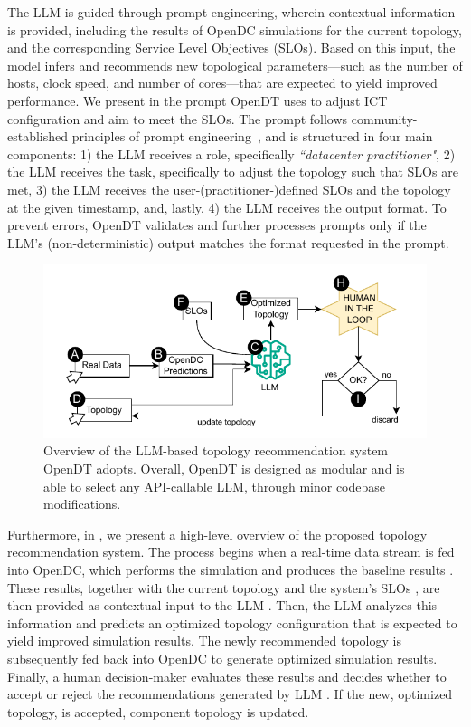 The LLM is guided through prompt engineering, wherein contextual information is provided, including the results of OpenDC simulations for the current topology, and the corresponding Service Level Objectives (SLOs). 
Based on this input, the model infers and recommends new topological parameters—such as the number of hosts, clock speed, and number of cores—that are expected to yield improved performance.
We present in  the prompt OpenDT uses to adjust ICT configuration and aim to meet the SLOs. The prompt follows community-established principles of prompt engineering~, and is structured in four main components: 1) the LLM receives a role, specifically \textit{``datacenter practitioner"}, 2) the LLM receives the task, specifically to adjust the topology such that SLOs are met, 3) the LLM receives the user-(practitioner-)defined SLOs and the topology at the given timestamp, and, lastly, 4) the LLM receives the output format. To prevent errors, OpenDT validates and further processes prompts only if the LLM's (non-deterministic) output matches the format requested in the prompt.


\begin{figure}[t]
    \centering
    \includegraphics[width=\linewidth]{report/figures/llm-hl-overview.pdf}
    \caption{Overview of the LLM-based topology recommendation system OpenDT adopts. Overall, OpenDT is designed as modular and is able to select any API-callable LLM, through minor codebase modifications.}
    \label{fig:llm-overview}
\end{figure}

Furthermore, in , we present a high-level overview of the proposed topology recommendation system. The process begins when a real-time data stream  is fed into OpenDC, which performs the simulation and produces the baseline results . These results, together with the current topology  and the system’s SLOs , are then provided as contextual input to the LLM . Then, the LLM analyzes this information and predicts an optimized topology configuration that is expected to yield improved simulation results. The newly recommended topology is subsequently fed back into OpenDC  to generate optimized simulation results. Finally, a human decision-maker  evaluates these results and decides whether to accept or reject the recommendations generated by LLM . If the new, optimized topology, is accepted, component topology  is updated.
